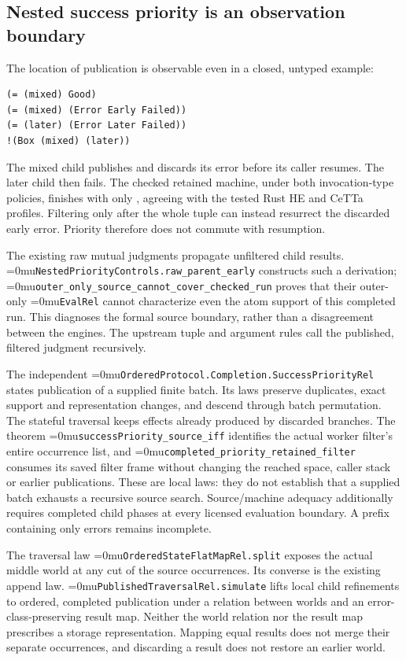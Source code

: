 \documentclass[11pt,a4paper]{article}
\newcommand{\code}[1]{\texttt{\detokenize{#1}}}
\newcommand{\name}[1]{\textup{\Urlmuskip=0mu\relax\nolinkurl{#1}}}
\begin{document}
\subsection*{Nested success priority is an observation boundary}

The location of publication is observable even in a closed, untyped example:
\begin{verbatim}
(= (mixed) Good)
(= (mixed) (Error Early Failed))
(= (later) (Error Later Failed))
!(Box (mixed) (later))
\end{verbatim}
The mixed child publishes \code{Good} and discards its error before its
caller resumes. The later child then fails. The checked retained machine,
under both invocation-type policies, finishes with only
\code{(Error Later Failed)}, agreeing with the tested Rust HE and CeTTa
profiles. Filtering only after the whole tuple can instead resurrect the
discarded early error. Priority therefore does not commute with resumption.

The existing raw mutual judgments propagate unfiltered child results.
\name{NestedPriorityControls.raw_parent_early} constructs such a derivation;
\name{outer_only_source_cannot_cover_checked_run} proves that their
outer-only \name{EvalRel} cannot characterize even the atom support of this
completed run. This diagnoses the formal source boundary, rather than a
disagreement between the engines. The upstream tuple and argument rules
call the published, filtered \code{metta} judgment recursively.

The independent \name{OrderedProtocol.Completion.SuccessPriorityRel} states publication
of a supplied finite batch. Its laws preserve duplicates, exact support and
representation changes, and descend through batch permutation. The stateful
traversal keeps effects already produced by discarded branches. The theorem
\name{successPriority_source_iff} identifies the actual worker filter's
entire occurrence list, and \name{completed_priority_retained_filter}
consumes its saved filter frame without changing the reached space, caller
stack or earlier publications. These are local laws: they do not establish
that a supplied batch exhausts a recursive source search. Source/machine
adequacy additionally requires completed child phases at every licensed
evaluation boundary. A prefix containing only errors remains incomplete.

The traversal law \name{OrderedStateFlatMapRel.split} exposes the actual
middle world at any cut of the source occurrences. Its converse is the
existing append law. \name{PublishedTraversalRel.simulate} lifts local child
refinements to ordered, completed publication under a relation between
worlds and an error-class-preserving result map. Neither the world relation
nor the result map prescribes a storage representation. Mapping equal
results does not merge their separate occurrences, and discarding a result
does not restore an earlier world.
\end{document}
